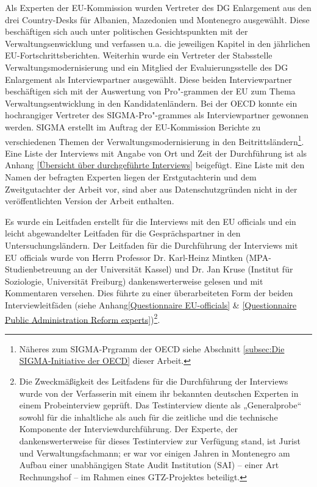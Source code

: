 Als Experten der EU-Kommission wurden Vertreter des DG Enlargement aus den drei Country-Desks für Albanien, Mazedonien und Montenegro ausgewählt. Diese beschäftigen sich auch unter politischen Gesichtspunkten mit der Verwaltungsenwicklung und verfassen u.a. die jeweiligen Kapitel in den jährlichen EU-Fortschrittsberichten. Weiterhin wurde ein Vertreter der Stabsstelle Verwaltungsmodernisierung und ein Mitglied der Evaluierungsstelle des DG Enlargement als Interviewpartner ausgewählt. Diese beiden Interviewpartner beschäftigen sich mit der Auswertung von Pro"-grammen der EU zum Thema Verwaltungsentwicklung in den Kandidatenländern. Bei der OECD konnte ein hochrangiger Vertreter des SIGMA-Pro"-grammes als Interviewpartner gewonnen werden. SIGMA erstellt im Auftrag der EU-Kommission Berichte zu verschiedenen Themen der Verwaltungsmodernisierung in den Beitrittsländern\footnote{Näheres zum SIGMA-Prgramm der OECD siehe Abschnitt \ref{subsec:Die SIGMA-Initiative der OECD} dieser Arbeit.}. Eine Liste der Interviews mit Angabe von Ort und Zeit der Durchführung ist als Anhang \ref{Übersicht über durchgeführte Interviews} beigefügt. Eine Liste mit den Namen der befragten Experten liegen der Erstgutachterin und dem Zweitgutachter der Arbeit vor, sind aber aus Datenschutzgründen nicht in der veröffentlichten Version der Arbeit enthalten.\par
Es wurde ein Leitfaden erstellt für die Interviews mit den EU officials und ein leicht abgewandelter Leitfaden für die Gesprächspartner in den Untersuchungsländern. Der Leitfaden für die Durchführung der Interviews mit EU officials wurde von Herrn Professor Dr. Karl-Heinz Mintken (MPA-Studienbetreuung an der Universität Kassel) und Dr. Jan Kruse (Institut für Soziologie, Universität Freiburg) dankenswerterweise gelesen und mit Kommentaren versehen. Dies führte zu einer überarbeiteten Form der beiden Interviewleitfäden (siehe Anhang\ref{Questionnaire EU-officials} \& \ref{Questionnaire Public Administration Reform experts})\footnote{Die Zweckmäßigkeit des Leitfadens für die Durchführung der Interviews wurde von der Verfasserin mit einem ihr bekannten deutschen Experten in einem Probeinterview geprüft. Das Testinterview diente als „Generalprobe“ sowohl für die inhaltliche als auch für die zeitliche und die technische Komponente der Interviewdurchführung. Der Experte, der dankenswerterweise für dieses Testinterview zur Verfügung stand, ist Jurist und Verwaltungsfachmann; er war vor einigen Jahren in Montenegro am Aufbau einer unabhängigen State Audit Institution (SAI) – einer Art Rechnungshof – im Rahmen eines GTZ-Projektes beteiligt. }.

